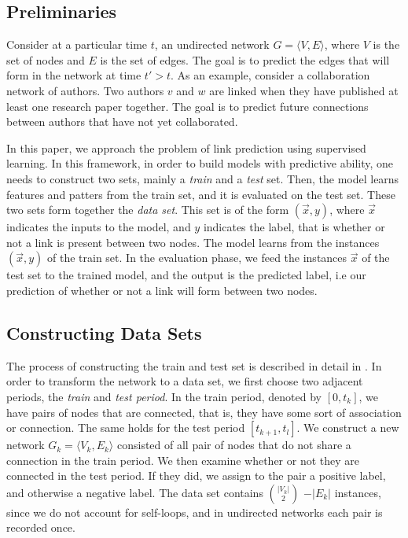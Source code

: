 \documentclass{acm_proc_article-sp}
\begin{document}
\subsection{Preliminaries}

Consider at a particular time $t$, an undirected network $G = \langle V,E \rangle$, where $V$ is the set of nodes and $E$ is the set of edges. The goal is to predict the edges that will form in the network at time $t' > t$. As an example, consider a collaboration network of authors. Two authors $v$ and $w$ are linked when they have published at least one research paper together. The goal is to predict future connections between authors that have not yet collaborated.

In this paper, we approach the problem of link prediction using supervised learning. In this framework, in order to build models with predictive ability, one needs to construct two sets, mainly a \textit{train} and a \textit{test} set. Then, the model learns features and patters from the train set, and it is evaluated on the test set. These two sets form together the \textit{data set}. This set is of the form $(\vec{x},y)$, where $\vec{x}$ indicates the inputs to the model, and $y$ indicates the label, that is whether or not a link is present between two nodes. The model learns from the instances $(\vec{x},y)$ of the train set. In the evaluation phase, we feed the instances $\vec{x}$ of the test set to the trained model, and the output is the predicted label, i.e our prediction of whether or not a link will form between two nodes.

\subsection{Constructing Data Sets}
\label{Sect.2a}

The process of constructing the train and test set is described in detail in \cite{Hasan06linkprediction, Lichtenwalter:2010:NPM:1835804.1835837}. In order to transform the network to a data set, we first choose two adjacent periods, the \textit{train} and \textit{test period}. In the train period, denoted by $[0,t_k]$, we have pairs of nodes that are connected, that is, they have some sort of association or connection. The same holds for the test period $[t_{k+1},t_l]$. We construct a new network $G_k = \langle V_k, E_k \rangle$ consisted of all pair of nodes that do not share a connection in the train period. We then examine whether or not they are connected in the test period. If they did, we assign to the pair a positive label, and otherwise a negative label. The data set contains $|V_k| \choose 2$ $-|E_k|$ instances, since we do not account for self-loops, and in undirected networks each pair is recorded once. 
\end{document}
